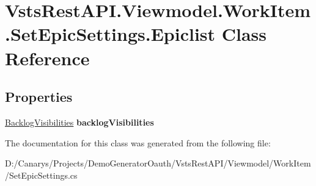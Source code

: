 \hypertarget{class_vsts_rest_a_p_i_1_1_viewmodel_1_1_work_item_1_1_set_epic_settings_1_1_epiclist}{}\section{Vsts\+Rest\+A\+P\+I.\+Viewmodel.\+Work\+Item.\+Set\+Epic\+Settings.\+Epiclist Class Reference}
\label{class_vsts_rest_a_p_i_1_1_viewmodel_1_1_work_item_1_1_set_epic_settings_1_1_epiclist}
\subsection*{Properties}
\begin{DoxyCompactItemize}
\item 
\mbox{\label{class_vsts_rest_a_p_i_1_1_viewmodel_1_1_work_item_1_1_set_epic_settings_1_1_epiclist_a3645bd8639271372fe3c003c98cf46f4}} 
\mbox{\hyperlink{class_vsts_rest_a_p_i_1_1_viewmodel_1_1_work_item_1_1_set_epic_settings_1_1_backlog_visibilities}{Backlog\+Visibilities}} {\bfseries backlog\+Visibilities}
\end{DoxyCompactItemize}


The documentation for this class was generated from the following file\+:\begin{DoxyCompactItemize}
\item 
D\+:/\+Canarys/\+Projects/\+Demo\+Generator\+Oauth/\+Vsts\+Rest\+A\+P\+I/\+Viewmodel/\+Work\+Item/Set\+Epic\+Settings.\+cs\end{DoxyCompactItemize}
